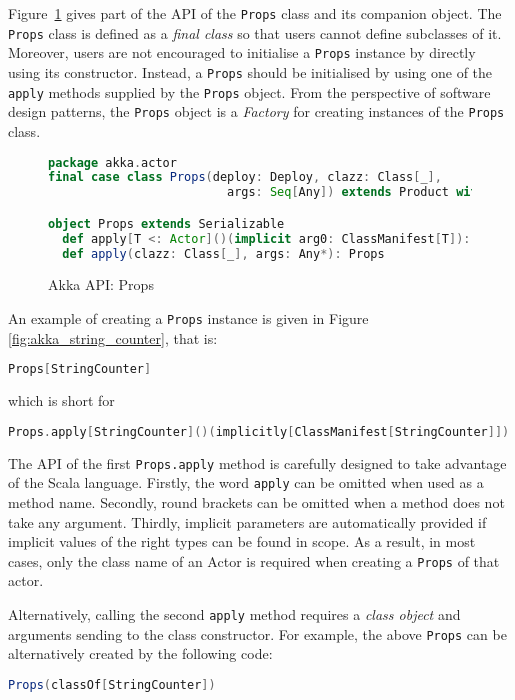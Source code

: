Figure~\ref{akka_props_api} gives part of the API of the {\tt Props} class and 
its companion object.  The {\tt Props} class is defined as a {\it final class} 
so that 
users cannot define subclasses of it.  Moreover, users are not encouraged to 
initialise a {\tt Props} instance by directly using its constructor.  Instead, a 
{\tt Props} should be initialised by using one of the {\tt apply} methods 
supplied by the {\tt Props} object.  From the perspective of software design 
patterns, the {\tt Props} object is a {\it Factory} for creating instances of 
the {\tt Props} class.

\begin{figure}[h]
\begin{lstlisting}[language=scala]
package akka.actor
final case class Props(deploy: Deploy, clazz: Class[_], 
                         args: Seq[Any]) extends Product with Serializable

object Props extends Serializable
  def apply[T <: Actor]()(implicit arg0: ClassManifest[T]): Props
  def apply(clazz: Class[_], args: Any*): Props
\end{lstlisting}
\caption{Akka API: Props}
\label{akka_props_api}
\end{figure}

An example of creating a {\tt Props} instance is given in Figure 
\ref{fig:akka_string_counter}, that is:

\begin{lstlisting}[language=scala]
  Props[StringCounter]
\end{lstlisting}
which is short for
\begin{lstlisting}[language=scala]  
  Props.apply[StringCounter]()(implicitly[ClassManifest[StringCounter]])
\end{lstlisting}

The API of the first {\tt Props.apply} method is carefully designed to take 
advantage of the Scala language.  Firstly, the word {\tt apply} can be 
omitted when used as a method name. Secondly, round brackets can be 
omitted when a method does not take any argument.  Thirdly, 
implicit parameters are automatically provided if implicit values of the right 
types can be found in scope.  As a result, in most cases, only the class name of 
an Actor is required when creating a {\tt Props} of that actor.

Alternatively, calling the second {\tt apply} method requires a {\it class 
object} and arguments sending to the class constructor.  
For example, the above {\tt Props} can be alternatively created by the following 
code:
\begin{lstlisting}[language=scala]
  Props(classOf[StringCounter])
\end{lstlisting}

